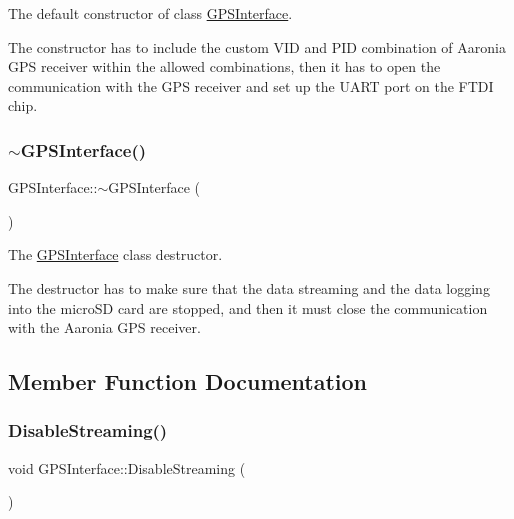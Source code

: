 The default constructor of class \hyperlink{classGPSInterface}{G\+P\+S\+Interface}. 

The constructor has to include the custom V\+ID and P\+ID combination of Aaronia G\+PS receiver within the allowed combinations, then it has to open the communication with the G\+PS receiver and set up the U\+A\+RT port on the F\+T\+DI chip. \mbox{\label{classGPSInterface_ac8156be0348867ab39ba6e7909e16c3b}} 
\subsubsection{\texorpdfstring{$\sim$\+G\+P\+S\+Interface()}{~GPSInterface()}}
{\footnotesize\ttfamily G\+P\+S\+Interface\+::$\sim$\+G\+P\+S\+Interface (\begin{DoxyParamCaption}{ }\end{DoxyParamCaption})}



The \hyperlink{classGPSInterface}{G\+P\+S\+Interface} class\textquotesingle{} destructor. 

The destructor has to make sure that the data streaming and the data logging into the micro\+SD card are stopped, and then it must close the communication with the Aaronia G\+PS receiver. 

\subsection{Member Function Documentation}
\mbox{\label{classGPSInterface_a663c36374cc097040cb8945a3c25b190}} 
\subsubsection{\texorpdfstring{Disable\+Streaming()}{DisableStreaming()}}
{\footnotesize\ttfamily void G\+P\+S\+Interface\+::\+Disable\+Streaming (\begin{DoxyParamCaption}{ }\end{DoxyParamCaption})}



